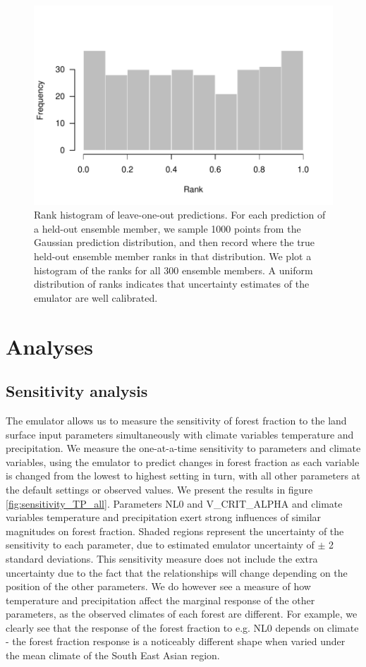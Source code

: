 \documentclass[gmd, manuscript]{copernicus}
\begin{document}
\begin{figure}[t]
\includegraphics[width=12cm]{../graphics/rankhist.pdf}
\caption{Rank histogram of leave-one-out predictions. For each prediction of a held-out ensemble member, we sample 1000 points from the Gaussian prediction distribution, and then record where the true held-out ensemble member ranks in that distribution. We plot a histogram of the ranks for all 300 ensemble members. A uniform distribution of ranks indicates that uncertainty estimates of the emulator are well calibrated.
}
\label{fig:rankhist}
\end{figure}

\section{Analyses}\label{sec:analyses}

\subsection{Sensitivity analysis}\label{ssec:sensitivity}
The emulator allows us to measure the sensitivity of forest fraction to the land surface input parameters simultaneously with climate variables temperature and precipitation. We measure the one-at-a-time sensitivity to parameters and climate variables, using the emulator to predict changes in forest fraction as each variable is changed from the lowest to highest setting in turn, with all other parameters at the default settings or observed values. We present the results in figure \ref{fig:sensitivity_TP_all}. Parameters NL0 and V\_CRIT\_ALPHA and climate variables temperature and precipitation exert strong influences of similar magnitudes on forest fraction. Shaded regions represent the uncertainty of the sensitivity to each parameter, due to estimated emulator uncertainty of $\pm$ 2 standard deviations. This sensitivity measure does not include the extra uncertainty due to the fact that the relationships will change depending on the position of the other parameters. We do however see a measure of how temperature and precipitation affect the marginal response of the other parameters, as the observed climates of each forest are different. For example, we clearly see that the response of the forest fraction to e.g. NL0 depends on climate - the forest fraction response is a noticeably different shape when varied under the mean climate of the South East Asian region.
\end{document}

